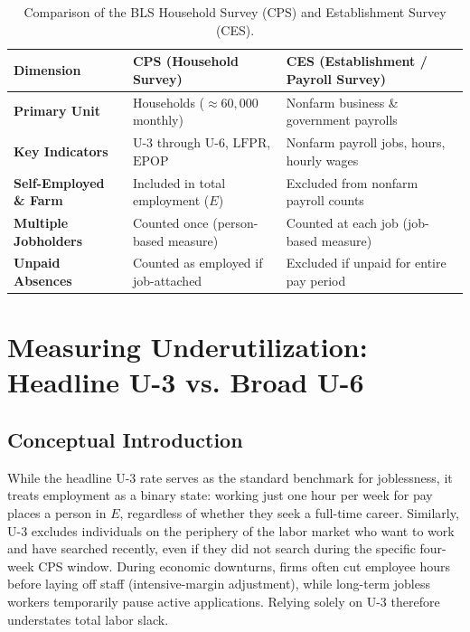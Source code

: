 \documentclass[11pt, a4paper]{article}
\begin{document}
\begin{table}[htbp]
\centering
\caption{Comparison of the BLS Household Survey (CPS) and Establishment Survey (CES).}
\label{tab:cps_vs_ces}
\small
\begin{tabularx}{\linewidth}{@{} l X X @{}}
\toprule
\textbf{Dimension} & \textbf{CPS (Household Survey)} & \textbf{CES (Establishment / Payroll Survey)} \\
\midrule
\textbf{Primary Unit} & Households ($\approx 60{,}000$ monthly) & Nonfarm business \& government payrolls \\
\textbf{Key Indicators} & $\text{U-3}$ through $\text{U-6}$, $\text{LFPR}$, $\text{EPOP}$ & Nonfarm payroll jobs, hours, hourly wages \\
\textbf{Self-Employed \& Farm} & Included in total employment ($E$) & Excluded from nonfarm payroll counts \\
\textbf{Multiple Jobholders} & Counted once (person-based measure) & Counted at each job (job-based measure) \\
\textbf{Unpaid Absences} & Counted as employed if job-attached & Excluded if unpaid for entire pay period \\
\bottomrule
\end{tabularx}
\end{table}

\section{Measuring Underutilization: Headline U-3 vs. Broad U-6}

\subsection*{Conceptual Introduction}
While the headline U-3 rate serves as the standard benchmark for joblessness, it treats employment as a binary state: working just one hour per week for pay places a person in $E$, regardless of whether they seek a full-time career. Similarly, U-3 excludes individuals on the periphery of the labor market who want to work and have searched recently, even if they did not search during the specific four-week CPS window. During economic downturns, firms often cut employee hours before laying off staff (intensive-margin adjustment), while long-term jobless workers temporarily pause active applications. Relying solely on U-3 therefore understates total labor slack.
\end{document}
